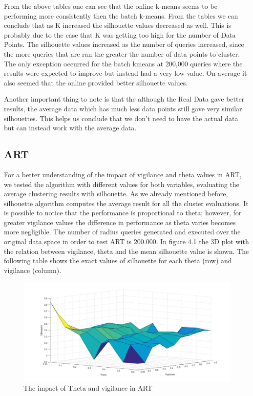 \documentclass{lmproj}
\begin{document}
From the above tables one can see that the online k-means seems to be performing more consistently then the batch k-means. From the tables we can conclude that as K increased the silhouette values decreased as well. This is probably due to the case that K was getting too high for the number of Data Points. The silhouette values increased as the number of queries increased, since the more queries that are ran the greater the number of data points to cluster. The only exception occurred for the batch kmeans at 200,000 queries where the results were expected to improve but instead had a very low value. On average it also seemed that the online provided better silhouette values.

Another important thing to note is that the although the Real Data gave better results, the average data which has much less data points still gave very similar silhouettes. This helps us conclude that we don't need to have the actual data but can instead work with the average data.

\subsection{ART}
For a better understanding of the impact of vigilance and theta values in ART, we tested the algorithm with different values for both variables, evaluating the average clustering results with silhouette. As we already mentioned before, silhouette algorithm computes the average result for all the cluster evaluations. It is possible to notice that the performance is proportional to theta; however, for greater vigilance values the difference in performance as theta varies becomes more negligible.
The number of radius queries generated and executed over the original data space in order to test ART is $200.000$. In figure 4.1 the 3D plot with the relation between vigilance, theta and the mean silhouette value is shown. The following table shows the exact values of silhouette for each theta (row) and vigilance (column).

\begin{figure}[ht]
	\centering
	\includegraphics[width=1.1\linewidth]{Evaluation_ART.jpg}
   \caption[ARTevaluation]{The impact of Theta and vigilance in ART}
\end{figure}
\end{document}

